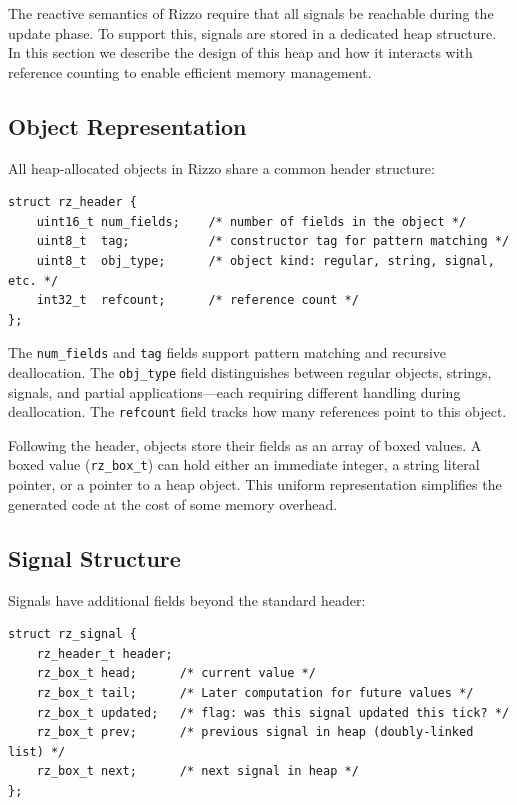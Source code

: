 The reactive semantics of Rizzo require that all signals be reachable during the update phase. To support this, signals are stored in a dedicated heap structure. In this section we describe the design of this heap and how it interacts with reference counting to enable efficient memory management.

\subsection{Object Representation}

All heap-allocated objects in Rizzo share a common header structure:

\begin{verbatim}
struct rz_header {
    uint16_t num_fields;    /* number of fields in the object */
    uint8_t  tag;           /* constructor tag for pattern matching */
    uint8_t  obj_type;      /* object kind: regular, string, signal, etc. */
    int32_t  refcount;      /* reference count */
};
\end{verbatim}

The \texttt{num\_fields} and \texttt{tag} fields support pattern matching and recursive deallocation. The \texttt{obj\_type} field distinguishes between regular objects, strings, signals, and partial applications---each requiring different handling during deallocation. The \texttt{refcount} field tracks how many references point to this object.

Following the header, objects store their fields as an array of boxed values. A boxed value (\texttt{rz\_box\_t}) can hold either an immediate integer, a string literal pointer, or a pointer to a heap object. This uniform representation simplifies the generated code at the cost of some memory overhead.

\subsection{Signal Structure}

Signals have additional fields beyond the standard header:

\begin{verbatim}
struct rz_signal {
    rz_header_t header;
    rz_box_t head;      /* current value */
    rz_box_t tail;      /* Later computation for future values */
    rz_box_t updated;   /* flag: was this signal updated this tick? */
    rz_box_t prev;      /* previous signal in heap (doubly-linked list) */
    rz_box_t next;      /* next signal in heap */
};
\end{verbatim}

